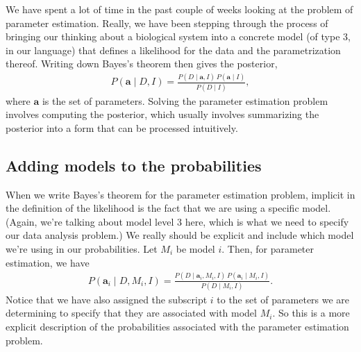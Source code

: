 We have spent a lot of time in the past couple of weeks looking at the
problem of parameter estimation.  Really, we have been stepping
through the process of bringing our thinking about a biological system
into a concrete model (of type 3, in our language) that defines a
likelihood for the data and the parametrization thereof.  Writing down
Bayes's theorem then gives the posterior,
\begin{align}
P(\mathbf{a}\mid D, I) = 
\frac{P(D\mid \mathbf{a},I)\,P(\mathbf{a}\mid I)}{P(D\mid I)},
\end{align}
where $\mathbf{a}$ is the set of parameters.  Solving the parameter
estimation problem involves computing the posterior, which usually
involves summarizing the posterior into a form that can be processed
intuitively.

\subsection{Adding models to the probabilities}
When we write Bayes's theorem for the parameter estimation problem,
implicit in the definition of the likelihood is the fact that we are
using a specific model. (Again, we're talking about model level 3
here, which is what we need to specify our data analysis problem.)  We
really should be explicit and include which model we're using in our
probabilities.  Let $M_i$ be model $i$.  Then, for parameter
estimation, we have
\begin{align}
P(\mathbf{a}_i\mid D, M_i, I) = 
\frac{P(D\mid \mathbf{a}_i, M_i, I)\,P(\mathbf{a}_i\mid M_i, I)}{P(D\mid M_i, I)}.
\label{eq:param_est}
\end{align}
Notice that we have also assigned the subscript $i$ to the set of
parameters we are determining to specify that they are associated with
model $M_i$.  So this is a more explicit description of the
probabilities associated with the parameter estimation problem.


